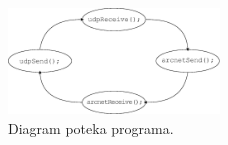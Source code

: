 \begin{figure}
	\centering
	\includegraphics[width=0.5\textwidth]{./Slike/server-arcnet-udp.eps}
	\caption{Diagram poteka programa.}
	\label{fig:server-arcnet-udp}
\end{figure}
